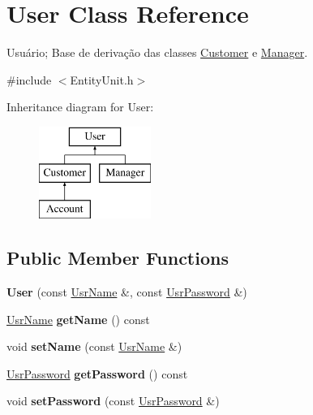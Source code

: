 \hypertarget{classUser}{\section{User Class Reference}
\label{classUser}
}


Usuário; Base de derivação das classes \hyperlink{classCustomer}{Customer} e \hyperlink{classManager}{Manager}.  




{\ttfamily \#include $<$Entity\-Unit.\-h$>$}

Inheritance diagram for User\-:\begin{figure}[H]
\begin{center}
\leavevmode
\includegraphics[height=3.000000cm]{classUser}
\end{center}
\end{figure}
\subsection*{Public Member Functions}
\begin{DoxyCompactItemize}
\item 
\hypertarget{classUser_a550edb2b7dae1148df00157962f4cbce}{{\bfseries User} (const \hyperlink{classUsrName}{Usr\-Name} \&, const \hyperlink{classUsrPassword}{Usr\-Password} \&)}\label{classUser_a550edb2b7dae1148df00157962f4cbce}

\item 
\hypertarget{classUser_ae1dd9bb1a02ea1aa4246da19c28cd831}{\hyperlink{classUsrName}{Usr\-Name} {\bfseries get\-Name} () const }\label{classUser_ae1dd9bb1a02ea1aa4246da19c28cd831}

\item 
\hypertarget{classUser_a3a25b1b158ff07d1349d1d3019c7c0c0}{void {\bfseries set\-Name} (const \hyperlink{classUsrName}{Usr\-Name} \&)}\label{classUser_a3a25b1b158ff07d1349d1d3019c7c0c0}

\item 
\hypertarget{classUser_a799c61fc6ff206a1b1edbc86d61989ed}{\hyperlink{classUsrPassword}{Usr\-Password} {\bfseries get\-Password} () const }\label{classUser_a799c61fc6ff206a1b1edbc86d61989ed}

\item 
\hypertarget{classUser_a524865340fb55a6bdc983143cc82fd5d}{void {\bfseries set\-Password} (const \hyperlink{classUsrPassword}{Usr\-Password} \&)}\label{classUser_a524865340fb55a6bdc983143cc82fd5d}

\end{DoxyCompactItemize}


